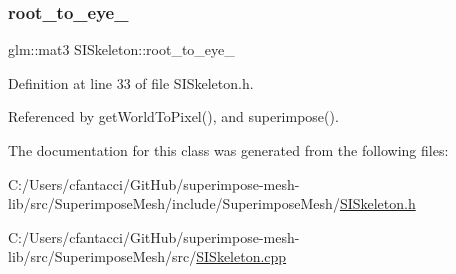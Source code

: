 \mbox{\label{classSISkeleton_a476442a8c9e9a1f4a703c3a84f0b83f1}} 
\subsubsection{\texorpdfstring{root\+\_\+to\+\_\+eye\+\_\+}{root\_to\_eye\_}}
{\footnotesize\ttfamily glm\+::mat3 S\+I\+Skeleton\+::root\+\_\+to\+\_\+eye\+\_\+\hspace{0.3cm}{\ttfamily [private]}}



Definition at line 33 of file S\+I\+Skeleton.\+h.



Referenced by get\+World\+To\+Pixel(), and superimpose().



The documentation for this class was generated from the following files\+:\begin{DoxyCompactItemize}
\item 
C\+:/\+Users/cfantacci/\+Git\+Hub/superimpose-\/mesh-\/lib/src/\+Superimpose\+Mesh/include/\+Superimpose\+Mesh/\mbox{\hyperlink{SISkeleton_8h}{S\+I\+Skeleton.\+h}}\item 
C\+:/\+Users/cfantacci/\+Git\+Hub/superimpose-\/mesh-\/lib/src/\+Superimpose\+Mesh/src/\mbox{\hyperlink{SISkeleton_8cpp}{S\+I\+Skeleton.\+cpp}}\end{DoxyCompactItemize}
